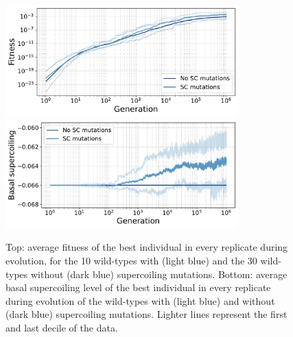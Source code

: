 \begin{figure}
\centering
\includegraphics[width=0.8\textwidth]{epistasis/img/fitness_all_with_main.pdf}
\includegraphics[width=0.8\textwidth]{epistasis/img/basal_sc_all.pdf}
\caption[Average basal supercoiling and fitness during evolution of the wild-types, with basal supercoiling level mutations]{Top: average fitness of the best individual in every replicate during evolution, for the 10 wild-types with (light blue) and the 30 wild-types without (dark blue) supercoiling mutations.
Bottom: average basal supercoiling level of the best individual in every replicate during evolution of the wild-types with (light blue) and without (dark blue) supercoiling mutations.
Lighter lines represent the first and last decile of the data.}
\label{fig:epistasis:wt-evolution}
\end{figure}


